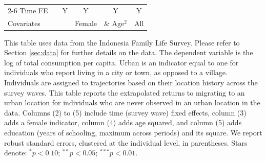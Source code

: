 \begin{table}[htb!]
\begin{threeparttable}
\begin{tabular}{l ccccc}
\cmidrule{2-6} Time FE & & Y & Y & Y & Y \\ Covariates & & & Female & \& Age$^2$ & All \\ \bottomrule \end{tabular} \begin{tablenotes} \footnotesize \item{This table uses data from the Indonesia Family Life Survey. Please refer to Section \ref{sec:data} for further details on the data. The dependent variable is the log of total consumption per capita. Urban is an indicator equal to one for individuals who report living in a city or town, as opposed to a village. Individuals are assigned to trajectories based on their location history across the survey waves. This table reports the extrapolated returns to migrating to an urban location for individuals who are never observed in an urban location in the data. Columns (2) to (5) include time (survey wave) fixed effects, column (3) adds a female indicator, column (4) adds age squared, and column (5) adds education (years of schooling, maximum across periods) and its square. We report robust standard errors, clustered at the individual level, in parentheses. Stars denote: $^{*} p<0.10$; $^{**} p<0.05$; $^{***} p<0.01$.} \end{tablenotes} \end{threeparttable} \end{table}
